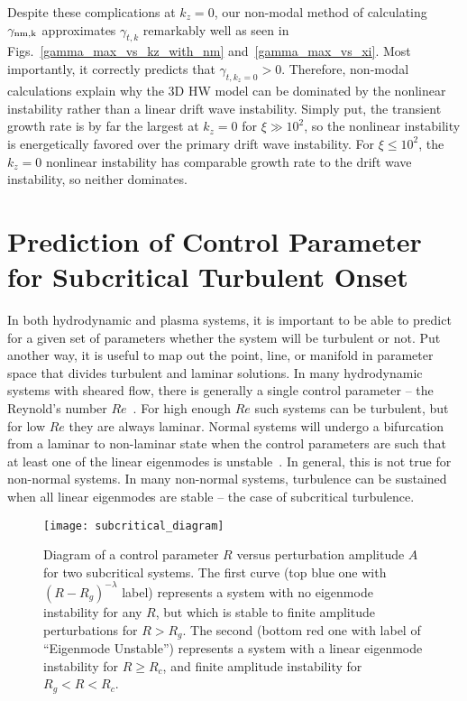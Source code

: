 \documentclass[twocolumn,showkeys,superscriptaddress]{revtex4}
\begin{document}
Despite these complications at $k_z=0$, our non-modal method of calculating $\gamma_{\rm{nm},k}$ approximates $\gamma_{t,k}$ remarkably well as seen in Figs.~\ref{gamma_max_vs_kz_with_nm}
and~\ref{gamma_max_vs_xi}. Most importantly, it correctly predicts that $\gamma_{t,k_z=0} > 0$. 
Therefore, non-modal calculations explain why the 3D HW model can be dominated by the nonlinear instability rather than a linear drift wave instability. 
Simply put, the transient growth rate is by far the largest at $k_z=0$ for $\xi \gg 10^2$, so the nonlinear instability is energetically favored over the primary drift wave instability.
For $\xi \le 10^2$, the $k_z=0$ nonlinear instability has comparable growth rate to the drift wave instability, so neither dominates.

\section{Prediction of Control Parameter for Subcritical Turbulent Onset}
\label{sec_subcrit_prediction}

In both hydrodynamic and plasma systems, it is important to be able to predict for a given set of parameters whether the system will be turbulent or not.
Put another way, it is useful to map out the point, line, or manifold in parameter space that divides turbulent and laminar solutions.
In many hydrodynamic systems with sheared flow, there is generally a single control parameter -- the Reynold's number $Re$~\cite{drazin1981}. For high enough $Re$ such systems
can be turbulent, but for low $Re$ they are always laminar.
Normal systems will undergo a bifurcation from a laminar to non-laminar state when the control parameters are such that at least one of the linear eigenmodes is unstable~\cite{grossmann2000}.
In general, this is not true for non-normal systems. In many non-normal systems, turbulence can be sustained when all linear eigenmodes are stable -- the case of subcritical turbulence. 

\begin{figure}
\centerline{\texttt{[image: subcritical\_diagram]}}
\caption{Diagram of a control parameter $R$ versus perturbation amplitude $A$ for two subcritical systems. The first curve (top blue one with $(R-R_g)^{-\lambda}$ label) represents a system with no
eigenmode instability for any $R$, but which is stable to finite amplitude perturbations for $R > R_g$. 
The second (bottom red one with label of ``Eigenmode Unstable'') represents a system with a linear eigenmode instability for $R \ge R_c$, and finite amplitude
instability for $R_g < R < R_c$.}
\label{subcritical_diagram}
\end{figure}
\end{document}
